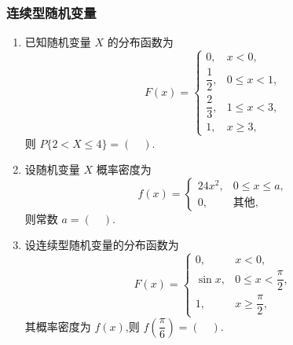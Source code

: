\subsubsection{连续型随机变量}

\begin{enumerate}

\item 已知随机变量 $X$ 的分布函数为
\[
F(x)=
\begin{cases}
0, & x<0,\\[2pt]
\dfrac{1}{2}, & 0\le x<1,\\[6pt]
\dfrac{2}{3}, & 1\le x<3,\\[6pt]
1, & x\ge 3,
\end{cases}
\]
则 $P\{2<X\le 4\}=(\quad)$.

\item 设随机变量 $X$ 概率密度为
\[
f(x)=
\begin{cases}
24x^2, & 0\le x\le a,\\
0, & \text{其他},
\end{cases}
\]
则常数 $a=(\quad)$.

\item 设连续型随机变量的分布函数为
\[
F(x)=
\begin{cases}
0, & x<0,\\[4pt]
\sin x, & 0\le x<\dfrac{\pi}{2},\\[6pt]
1, & x\ge \dfrac{\pi}{2},
\end{cases}
\]
其概率密度为 $f(x)$,则 $f\!\left(\dfrac{\pi}{6}\right)=(\quad)$.


\end{enumerate}
